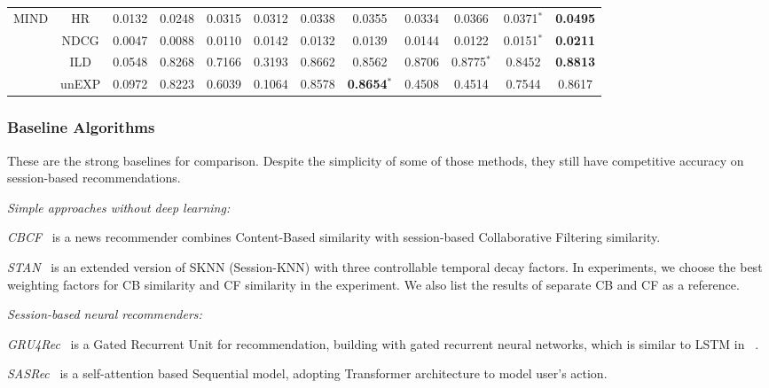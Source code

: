 \begin{table}[th]
\begin{tabular}{|c|c|ccccccccc|c|}
    \hline
    \multirow{5}{*}{MIND} & HR & 0.0132 & 0.0248 & 0.0315 & 0.0312 & 0.0338 & 0.0355 & 0.0334 & 0.0366 & 0.0371$^*$ & \textbf{0.0495}\\ 
    \cline{2-12}
    & NDCG & 0.0047 & 0.0088 & 0.0110 & 0.0142 & 0.0132 & 0.0139 & 0.0144 & 0.0122 & 0.0151$^*$ & \textbf{0.0211}\\
    \cline{2-12} 
    & ILD & 0.0548 & 0.8268 & 0.7166 & 0.3193 & 0.8662 & 0.8562 & 0.8706 & 0.8775$^*$ & 0.8452 & \textbf{0.8813}\\ 
    \cline{2-12}
    & unEXP & 0.0972 & 0.8223 & 0.6039 & 0.1064 & 0.8578 & \textbf{0.8654}$^*$ & 0.4508 & 0.4514 & 0.7544 & 0.8617 \\ 
    \cline{2-12}
    \hline
  \end{tabular}
  \end{table}


\subsubsection{Baseline Algorithms}
These are the strong baselines for comparison. Despite the simplicity of some of those methods, they still have competitive accuracy on session-based recommendations.

\noindent
\textit{Simple approaches without deep learning:}

\textit{CBCF}~\cite{sottocornola2018session} is a news recommender combines Content-Based similarity with session-based Collaborative Filtering similarity.

\textit{STAN}~\cite{garg2019sequence} is an extended version of SKNN (Session-KNN) with three controllable temporal decay factors. In experiments, we choose the best weighting factors for CB similarity and CF similarity in the experiment. We also list the results of separate CB and CF as a reference.

\noindent
\textit{Session-based neural recommenders:}

  \textit{GRU4Rec}~\cite{hidasi2015session,hidasi2018recurrent} is a Gated Recurrent Unit for recommendation, building with gated recurrent neural networks, which is similar to LSTM in ~\cite{gabriel2019contextual}.

  \textit{SASRec}~\cite{kang_self-attentive_2018} is a self-attention based Sequential model, adopting Transformer architecture to model user's action.
  
